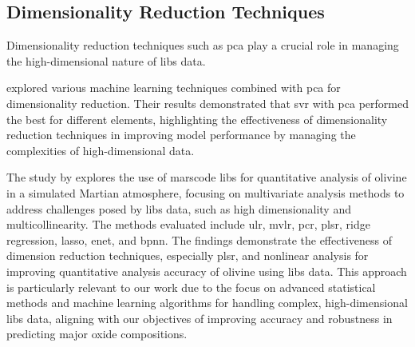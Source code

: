 \subsection{Dimensionality Reduction Techniques}
Dimensionality reduction techniques such as \gls{pca} play a crucial role in managing the high-dimensional nature of \gls{libs} data.

\citet{rezaei_dimensionality_reduction} explored various machine learning techniques combined with \gls{pca} for dimensionality reduction. Their results demonstrated that \gls{svr} with \gls{pca} performed the best for different elements, highlighting the effectiveness of dimensionality reduction techniques in improving model performance by managing the complexities of high-dimensional data.

The study by \citet{liuComparisonQuantitativeAnalysis2022} explores the use of \gls{marscode} \gls{libs} for quantitative analysis of olivine in a simulated Martian atmosphere, focusing on multivariate analysis methods to address challenges posed by \gls{libs} data, such as high dimensionality and multicollinearity.
The methods evaluated include \gls{ulr}, \gls{mvlr}, \gls{pcr}, \gls{plsr}, ridge regression, \gls{lasso}, \gls{enet}, and \gls{bpnn}.
The findings demonstrate the effectiveness of dimension reduction techniques, especially \gls{plsr}, and nonlinear analysis for improving quantitative analysis accuracy of olivine using \gls{libs} data.
This approach is particularly relevant to our work due to the focus on advanced statistical methods and machine learning algorithms for handling complex, high-dimensional \gls{libs} data, aligning with our objectives of improving accuracy and robustness in predicting major oxide compositions.
